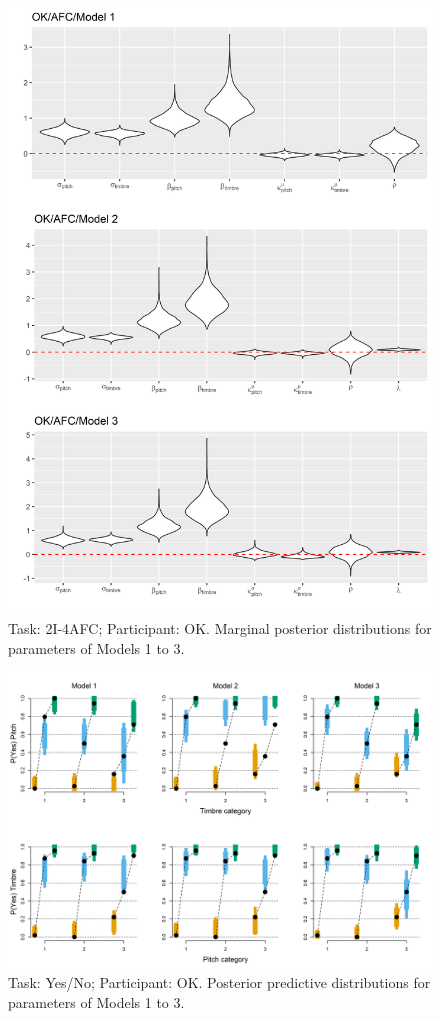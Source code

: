 \documentclass{article}\usepackage{knitr}
\begin{document}
\begin{figure}[H]
\centering
\includegraphics[scale=0.75, angle = 0]{Analysis_of_Human_Data/OK_AFC_Basic_models}
\caption{Task: 2I-4AFC; Participant: OK. Marginal posterior distributions for parameters of Models 1 to 3.}
\label{fig:OK_AFC_Basic_models}
\end{figure}

\begin{figure}[H]
\centering
\includegraphics[scale=0.75, angle = 270]{Analysis_of_Human_Data/OK_YN_post_pred}
\caption{Task: Yes/No; Participant: OK. Posterior predictive distributions for parameters of Models 1 to 3.}
\label{fig:OK_YN_post_pred}
\end{figure}
\end{document}
